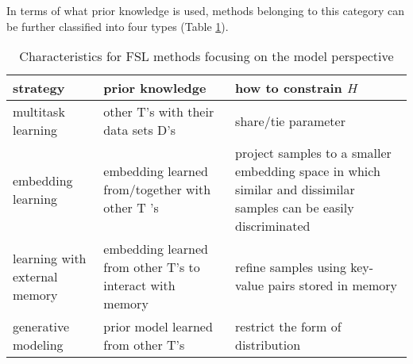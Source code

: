 \documentclass[12pt]{informs4}
\begin{document}
In terms of what prior knowledge is used, methods belonging to this category can be further classified into four types (Table \ref{t2}).\\

\begin{table}[H]
\caption{Characteristics for FSL methods focusing on the model perspective}
\begin{tabular}{|p{4cm}|p{4cm}|p{4cm}|}
\hline
strategy & prior knowledge & how to constrain $H$\\
\hline
multitask learning & other T’s with their data sets D’s & share/tie parameter\\
\hline
embedding learning & embedding learned from/together with other T ’s & project samples to a smaller embedding space in which similar and dissimilar samples can be easily discriminated\\
\hline
learning with external memory & embedding learned from other T’s to interact with memory & refine samples using key-value pairs stored in memory\\
\hline
generative modeling & prior model learned from other T’s & restrict the form of distribution\\
\hline
\end{tabular}
\label{t2}
\end{table}
\end{document}
